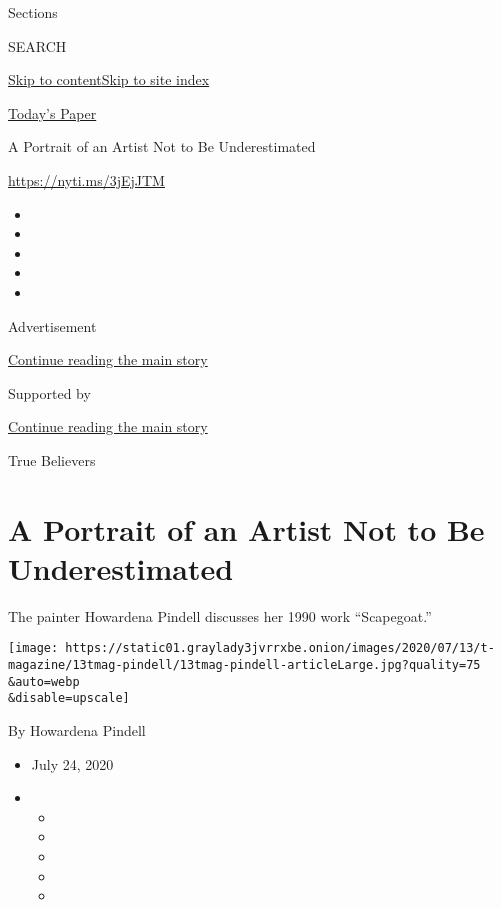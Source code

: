 Sections

SEARCH

\protect\hyperlink{site-content}{Skip to
content}\protect\hyperlink{site-index}{Skip to site index}

\href{https://myaccount.nytimes3xbfgragh.onion/auth/login?response_type=cookie\&client_id=vi}{}

\href{https://www.nytimes3xbfgragh.onion/section/todayspaper}{Today's
Paper}

A Portrait of an Artist Not to Be Underestimated

\url{https://nyti.ms/3jEjJTM}

\begin{itemize}
\item
\item
\item
\item
\item
\end{itemize}

Advertisement

\protect\hyperlink{after-top}{Continue reading the main story}

Supported by

\protect\hyperlink{after-sponsor}{Continue reading the main story}

True Believers

\hypertarget{a-portrait-of-an-artist-not-to-be-underestimated}{%
\section{A Portrait of an Artist Not to Be
Underestimated}\label{a-portrait-of-an-artist-not-to-be-underestimated}}

The painter Howardena Pindell discusses her 1990 work ``Scapegoat.''

\texttt{[image: https://static01.graylady3jvrrxbe.onion/images/2020/07/13/t-magazine/13tmag-pindell/13tmag-pindell-articleLarge.jpg?quality=75\\\&auto=webp\\\&disable=upscale]}

By Howardena Pindell

\begin{itemize}
\item
  July 24, 2020
\item
  \begin{itemize}
  \item
  \item
  \item
  \item
  \item
  \end{itemize}
\end{itemize}

